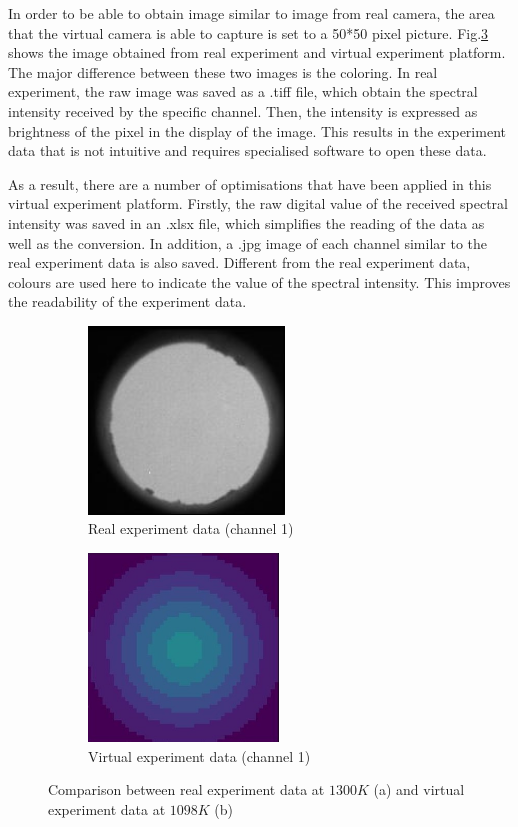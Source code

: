 In order to be able to obtain image similar to image from
real camera, the area that the virtual camera is able to capture is 
set to a 50*50 pixel picture. Fig.\ref{fig: camera} shows the image obtained 
from real experiment and virtual experiment platform. The major difference between 
these two images is the coloring. In real experiment, the raw image was saved 
as a .tiff file, which obtain the spectral intensity received by the specific 
channel. Then, the intensity is expressed as brightness of the pixel in the display of 
the image. This results in the experiment data that is not intuitive and 
requires specialised software to open these data.


As a result, there are a number of optimisations that have been applied 
in this virtual experiment platform. Firstly, the raw digital value 
of the received spectral intensity was saved in an .xlsx file, which 
simplifies the reading of the data as well as the conversion. In 
addition, a .jpg image of each channel similar to the real experiment data is also 
saved. Different from the real experiment data, colours are used here to 
indicate the value of the spectral intensity. This improves the 
readability of the experiment data.


\begin{figure}[htbp]
    \centering
    \begin{subfigure}{0.45\textwidth}
        \centering
        \includegraphics[height=5cm]{figures/real_camera_1075.JPG}
        \caption{Real experiment data  (channel 1)}
        \label{fig: real_camera}
    \end{subfigure}
    \begin{subfigure}{0.45\textwidth}
        \centering
        \includegraphics[height=5cm]{figures/virtual_camera_1098.jpg}
        \caption{Virtual experiment data (channel 1)}
        \label{fig: virtual_camera}
    \end{subfigure}
    \caption{Comparison between real experiment data at $1300K$ (a)
    and virtual experiment data at $1098K$ (b)
    }
    \label{fig: camera}
\end{figure}


